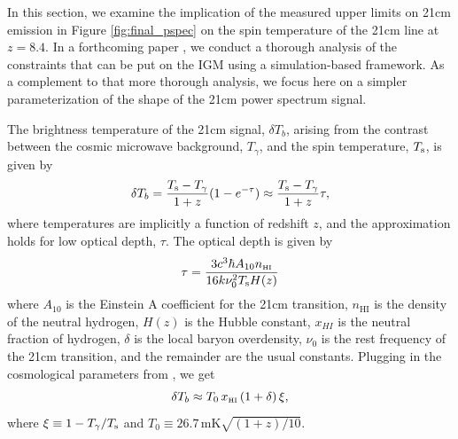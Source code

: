 \documentclass[twocolumn,numberedappendix]{emulateapj} \shorttitle{PSA64}
\newcommand{\Tspin}{T_{\rm s}}
\newcommand{\Tcmb}{T_\gamma}
\begin{document}
In this section, we examine the implication of the measured upper limits
on 21cm emission in Figure \ref{fig:final_pspec} on the spin temperature
of the 21cm line at $z=8.4$.
In a forthcoming paper \citet{pober_et_al2015}, we conduct a thorough analysis of the
constraints that can be put on the IGM using a simulation-based framework.
As a complement to that more thorough
analysis, we focus here on a simpler parameterization of the shape
of the 21cm power spectrum signal. 

The brightness temperature of the 21cm signal, $\delta{T_{b}}$, arising from the
contrast between the cosmic
microwave background, $\Tcmb$, and the spin temperature, $\Tspin$, is given
by 
\begin{equation}\label{eqn:tb}
    \delta{T_{b}} = \frac{\Tspin - \Tcmb}{1+z}(1-e^{-\tau})
\approx \frac{\Tspin - \Tcmb}{1+z}\tau,
\end{equation}
where temperatures are implicitly a function of redshift $z$, and
the approximation holds for low optical depth, $\tau$. 
The optical depth is given by \citep{zaldarriaga_et_al2004}
\begin{equation}\label{eqn:tau}
    \tau = \frac{3c^3\hbar A_{10} n_{\text{\tiny{HI}}}}{16k\nu_0^2\Tspin H(z)}
\end{equation}
where $A_{10}$ is the Einstein A coefficient for the 21cm transition,
$n_{\text{HI}}$ is the density of the neutral hydrogen, $H(z)$ is the Hubble
constant, $x_{HI}$ is the neutral fraction of hydrogen, $\delta$ is the local
baryon overdensity, $\nu_0$ is the rest frequency of the 21cm transition, and 
the remainder are the usual constants.
Plugging in the cosmological parameters from \citet{planck_et_al2015}, 
we get 
\begin{equation}\label{eqn:final_tb}
    \delta{T_{b}} \approx T_{0}\,x_{\text{\tiny{HI}}}\,(1+\delta)\, \xi ,
\end{equation}
where $\xi\equiv1-\Tcmb/\Tspin$ and $T_0\equiv26.7 \,
\text{mK} \sqrt{(1+z)/10}$.
\end{document}
